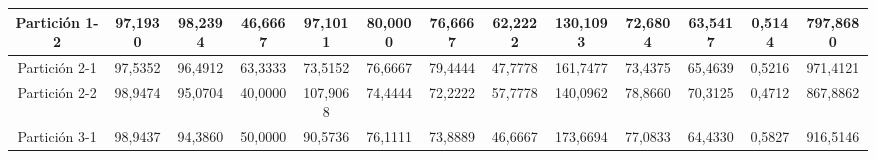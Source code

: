\documentclass[12pt]{article}
\begin{document}
\begin{table}[H]
{\begin{tabular}{|c|cccc|cccc|cccc|}
Partición 1-2 & \multicolumn{1}{c|}{97,1930}                                                  & \multicolumn{1}{c|}{98,2394}                                                 & \multicolumn{1}{c|}{46,6667} & 97,1011  & \multicolumn{1}{c|}{80,0000}                                                  & \multicolumn{1}{c|}{76,6667}                                                 & \multicolumn{1}{c|}{62,2222} & 130,1093 & \multicolumn{1}{c|}{72,6804}                                                  & \multicolumn{1}{c|}{63,5417}                                                 & \multicolumn{1}{c|}{0,5144}  & 797,8680  \\ \hline
Partición 2-1 & \multicolumn{1}{c|}{97,5352}                                                  & \multicolumn{1}{c|}{96,4912}                                                 & \multicolumn{1}{c|}{63,3333} & 73,5152  & \multicolumn{1}{c|}{76,6667}                                                  & \multicolumn{1}{c|}{79,4444}                                                 & \multicolumn{1}{c|}{47,7778} & 161,7477 & \multicolumn{1}{c|}{73,4375}                                                  & \multicolumn{1}{c|}{65,4639}                                                 & \multicolumn{1}{c|}{0,5216}  & 971,4121  \\ \hline
Partición 2-2 & \multicolumn{1}{c|}{98,9474}                                                  & \multicolumn{1}{c|}{95,0704}                                                 & \multicolumn{1}{c|}{40,0000} & 107,9068 & \multicolumn{1}{c|}{74,4444}                                                  & \multicolumn{1}{c|}{72,2222}                                                 & \multicolumn{1}{c|}{57,7778} & 140,0962 & \multicolumn{1}{c|}{78,8660}                                                  & \multicolumn{1}{c|}{70,3125}                                                 & \multicolumn{1}{c|}{0,4712}  & 867,8862  \\ \hline
Partición 3-1 & \multicolumn{1}{c|}{98,9437}                                                  & \multicolumn{1}{c|}{94,3860}                                                 & \multicolumn{1}{c|}{50,0000} & 90,5736  & \multicolumn{1}{c|}{76,1111}                                                  & \multicolumn{1}{c|}{73,8889}                                                 & \multicolumn{1}{c|}{46,6667} & 173,6694 & \multicolumn{1}{c|}{77,0833}                                                  & \multicolumn{1}{c|}{64,4330}                                                 & \multicolumn{1}{c|}{0,5827}  & 916,5146  \\ \hline

\end{tabular}}
\end{table}
\end{document}
